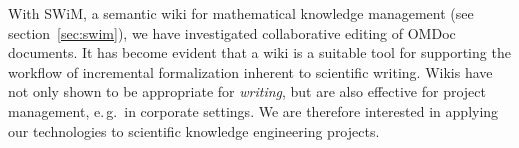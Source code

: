 With SWiM, a semantic wiki for mathematical knowledge management (see
section~\ref{sec:swim}),
we have investigated collaborative editing of OMDoc documents.  It 
has become evident that a wiki is a suitable tool for supporting the workflow
of incremental formalization inherent to scientific writing.  Wikis
have not only shown to be appropriate for \emph{writing}, but are also
effective for project management, e.\,g.\ in
corporate settings\cite{leuf01:wikiway,wikinomics}.  We are therefore
interested in applying our technologies to scientific knowledge
engineering projects.

